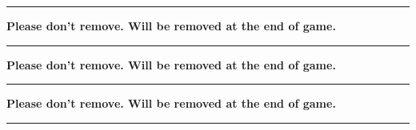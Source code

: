 \documentclass{article}
\begin{document}
\hrule
\vspace{10mm}

\Large\textbf{Please don't remove. Will be removed at the end of game.}
\vspace{10mm}

\hrule
\vspace{10mm}

\Large\textbf{Please don't remove. Will be removed at the end of game.}
\vspace{10mm}

\hrule
\vspace{10mm}

\Large\textbf{Please don't remove. Will be removed at the end of game.}
\vspace{10mm}

\hrule
\end{document}
